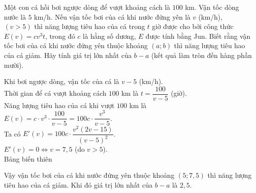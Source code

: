 \begin{bt}%
Một con cá hồi bơi ngược dòng để vượt khoảng cách là $100$ km. Vận tốc dòng nước là $5$ km/h. Nếu vận tốc bơi của cá khi nước đứng yên là $v$ (km/h), $\left(v >5 \right)$ thì năng lượng tiêu hao của cá trong $t$ giờ được cho bởi công thức $E \left(v \right)= c v^3 t $, trong đó $c$ là hằng số dương, $E$ được tính bằng Jun. Biết rằng vận tốc bơi của cá khi nước đứng yên thuộc khoảng $\left(a; b \right)$ thì năng lượng tiêu hao của cá giảm. Hãy tính giá trị lớn nhất của $b-a$ (kết quả làm tròn đến hàng phần mười). 
\loigiai
{
Khi bơi ngược dòng, vận tốc của cá là $v-5$ (km/h). \\
Thời gian để cá vượt khoảng cách $100$ km là $t = \dfrac{100}{v-5}$ (giờ). \\
Năng lượng tiêu hao của cá khi vượt $100$ km là $E (v) = c \cdot v^3 \cdot \dfrac{100}{v-5} = 100 c \cdot \dfrac{v^3}{v-5}$. \\
Ta có $E' \left(v \right) = 100 c \cdot \dfrac{v^2 \left(2v -15 \right)}{\left(v-5 \right)^2}$. \\
$E' \left(v \right) =0 \Leftrightarrow v = 7{,}5$ (do $v >5$). \\ 
Bảng biến thiên 
\begin{center}
\end{center}
Vậy vận tốc bơi của cá khi nước đứng yên thuộc khoảng $\left(5; 7{,}5\right)$ thì năng lượng tiêu hao của cá giảm. Khi đó giá trị lớn nhất của $b-a$ là $2{,}5$. 
}
\end{bt}

